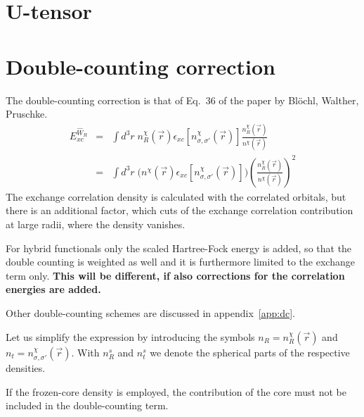 \documentclass[11pt,a4paper]{report}
\begin{document}
\section{U-tensor}
\section{Double-counting correction}
The double-counting correction is that of Eq.~36 of the paper by
Bl\"ochl, Walther, Pruschke\cite{bloechl11_prb84_205101}.
\begin{eqnarray}
E_{xc}^{\hat{W}_R}
&=&
\int d^3r\; n^\chi_R(\vec{r})
\epsilon_{xc}[n^\chi_{\sigma,\sigma'}(\vec{r})]
\frac{n^\chi_R(\vec{r})}{n^\chi(\vec{r})}
\nonumber\\
&=&
\int d^3r\; \biggl(n^\chi(\vec{r})
\epsilon_{xc}[n^\chi_{\sigma,\sigma'}(\vec{r})]\biggr)
\left(\frac{n^\chi_R(\vec{r})}{n^\chi(\vec{r})}\right)^2
\end{eqnarray}
The exchange correlation density is calculated with the correlated
orbitals, but there is an additional factor, which cuts of the
exchange correlation contribution at large radii, where the density
vanishes.

For hybrid functionals only the scaled Hartree-Fock energy is added,
so that the double counting is weighted as well and it is furthermore
limited to the exchange term only. \textbf{This will be different, if
  also corrections for the correlation energies are added.}

Other double-counting schemes are discussed in appendix~\ref{app:dc}.


Let us simplify the expression by introducing the symbols
$n_R=n^\chi_R(\vec{r})$ and $n_t=n^\chi_{\sigma,\sigma'}(\vec{r})$.
With $n^s_R$ and $n^s_t$ we denote the spherical parts of the
respective densities.

If the frozen-core density is employed, the contribution of the core
must not be included in the double-counting term.
\end{document}
